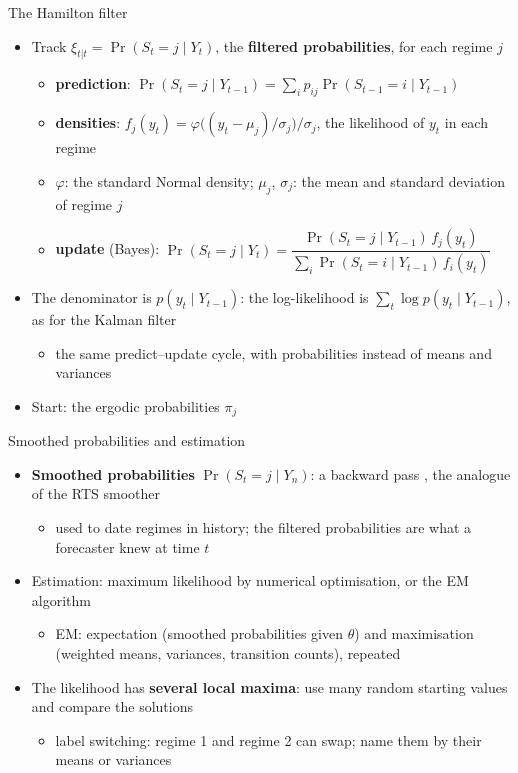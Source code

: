 \begin{frame}{The Hamilton filter}
\itemsize{\small}
\begin{itemize}
    \item Track $\xi_{t|t} = \Pr(S_t = j \mid Y_t)$, the \textbf{filtered probabilities}, for each regime $j$
    \begin{itemize}
        \item \textbf{prediction}: $\Pr(S_t = j \mid Y_{t-1}) = \sum_i p_{ij}\Pr(S_{t-1} = i \mid Y_{t-1})$
        \item \textbf{densities}: $f_j(y_t) = \varphi\bigl((y_t - \mu_j)/\sigma_j\bigr)/\sigma_j$, the likelihood of $y_t$ in each regime
        \item $\varphi$: the standard Normal density; $\mu_j$, $\sigma_j$: the mean and standard deviation of regime $j$
        \item \textbf{update} (Bayes): $\Pr(S_t = j \mid Y_t) = \dfrac{\Pr(S_t = j \mid Y_{t-1})\,f_j(y_t)}{\sum_i\Pr(S_t = i \mid Y_{t-1})\,f_i(y_t)}$
    \end{itemize}
    \item The denominator is $p(y_t \mid Y_{t-1})$: the log-likelihood is $\sum_t\log p(y_t \mid Y_{t-1})$, as for the Kalman filter
    \begin{itemize}
        \item the same predict--update cycle, with probabilities instead of means and variances
    \end{itemize}
    \item Start: the ergodic probabilities $\pi_j$
\end{itemize}
\end{frame}

\begin{frame}{Smoothed probabilities and estimation}
\itemsize{\small}
\begin{itemize}
    \item \textbf{Smoothed probabilities} $\Pr(S_t = j \mid Y_n)$: a backward pass , the analogue of the RTS smoother
    \begin{itemize}
        \item used to date regimes in history; the filtered probabilities are what a forecaster knew at time $t$
    \end{itemize}
    \item Estimation: maximum likelihood by numerical optimisation, or the EM algorithm 
    \begin{itemize}
        \item EM: expectation (smoothed probabilities given $\theta$) and maximisation (weighted means, variances, transition counts), repeated
    \end{itemize}
    \item The likelihood has \textbf{several local maxima}: use many random starting values and compare the solutions
    \begin{itemize}
        \item label switching: regime 1 and regime 2 can swap; name them by their means or variances
    \end{itemize}
\end{itemize}
\end{frame}

